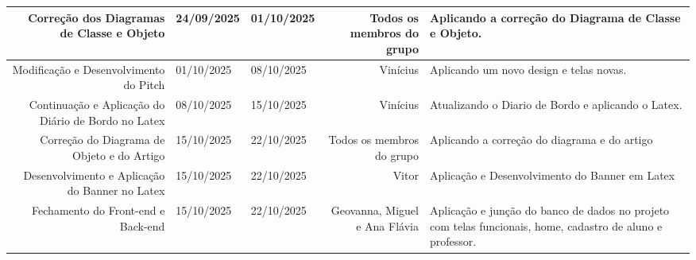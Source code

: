 \documentclass[
    landscape, %
    a4paper,
    12pt,
    brazilian,
]{article}
\newlength{\colAtividadeF}
\newlength{\colDataF}
\newlength{\colResponsavelF}
\begin{document}
\begin{center} 
\renewcommand{\arraystretch}{1.2} %

\begin{tabularx}{\textwidth}{|N{\colAtividadeF}|M{\colDataF}|M{\colDataF}|N{\colResponsavelF}|>{\raggedright\arraybackslash}X|}
\hline
Correção dos Diagramas de Classe e Objeto & 24/09/2025 & 01/10/2025 & Todos os membros do grupo & Aplicando a correção do Diagrama de Classe e Objeto.\\ \hline
Modificação e Desenvolvimento do Pitch & 01/10/2025 & 08/10/2025 & Vinícius & Aplicando um novo design e telas novas.\\ \hline
Continuação e Aplicação do Diário de Bordo no Latex& 08/10/2025 & 15/10/2025 & Vinícius& Atualizando o Diario de Bordo e aplicando o Latex.\\ \hline
Correção do Diagrama de Objeto e do Artigo & 15/10/2025 & 22/10/2025 & Todos os membros do grupo & Aplicando a correção do diagrama e do artigo\\ \hline
Desenvolvimento e Aplicação do Banner no Latex&15/10/2025&22/10/2025&Vitor&Aplicação e Desenvolvimento do Banner em Latex\\ \hline
Fechamento do Front-end e Back-end&15/10/2025&22/10/2025&Geovanna, Miguel e Ana Flávia& Aplicação e junção do banco de dados no projeto com telas funcionais, home, cadastro de aluno e professor.\\ \hline

\end{tabularx}
\end{center} 
\end{document}
